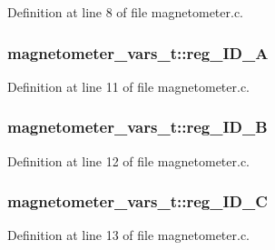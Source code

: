 Definition at line 8 of file magnetometer.\+c.

\subsubsection[{\texorpdfstring{reg\+\_\+\+I\+D\+\_\+A}{reg_ID_A}}]{ magnetometer\+\_\+vars\+\_\+t\+::reg\+\_\+\+I\+D\+\_\+A}\hypertarget{structmagnetometer__vars__t_ac4b3abaa6b37861ea66ee50555c237a1}{}\label{structmagnetometer__vars__t_ac4b3abaa6b37861ea66ee50555c237a1}


Definition at line 11 of file magnetometer.\+c.

\subsubsection[{\texorpdfstring{reg\+\_\+\+I\+D\+\_\+B}{reg_ID_B}}]{ magnetometer\+\_\+vars\+\_\+t\+::reg\+\_\+\+I\+D\+\_\+B}\hypertarget{structmagnetometer__vars__t_a1c19cb325b72956c635485d2501c3a33}{}\label{structmagnetometer__vars__t_a1c19cb325b72956c635485d2501c3a33}


Definition at line 12 of file magnetometer.\+c.

\subsubsection[{\texorpdfstring{reg\+\_\+\+I\+D\+\_\+C}{reg_ID_C}}]{ magnetometer\+\_\+vars\+\_\+t\+::reg\+\_\+\+I\+D\+\_\+C}\hypertarget{structmagnetometer__vars__t_a94342a4eaba965643d77e850e2979378}{}\label{structmagnetometer__vars__t_a94342a4eaba965643d77e850e2979378}


Definition at line 13 of file magnetometer.\+c.

